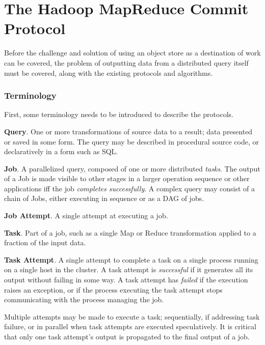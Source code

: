 \documentclass[format=acmsmall, screen=true, nonacm, timestamp, review=false]{acmart}
\begin{document}

\section{The Hadoop MapReduce Commit Protocol}
\label{sec:hadoop-mr-commit}

Before the challenge and solution of using an object store as a destination
of work can be covered, the problem of outputting data from a distributed
query itself must be covered, along with the existing protocols and algorithms.


\subsubsection{Terminology}

First, some terminology needs to be introduced to describe
the protocols.


\textbf{Query}.
One or more transformations of source data to a result;
data presented or saved in some form.
The query may be described in procedural source code,
or declaratively in a form such as SQL\@.


\textbf{Job}.
A parallelized query, composed of one or more distributed \emph{tasks}.
The output of a Job is made visible to other stages in a larger operation
sequence or other applications iff the job \emph{completes successfully}.
A complex query may consist of a chain of Jobs, either executing in sequence
or as a DAG of jobs.

\textbf{Job Attempt}.
A single attempt at executing a job.

\textbf{Task}.
Part of a job, such as a single Map or Reduce transformation applied to a fraction
of the input data.


\textbf{Task Attempt}.
A single attempt to complete a task on a single process running on a single host
in the cluster.
A task attempt is \emph{successful} if it generates all its output without
failing in some way.
A task attempt has \emph{failed} if the execution raises an exception, or
if the process executing the task attempt stops communicating with
the process managing the job.

Multiple attempts may be made to execute a task;
sequentially, if addressing task failure, or in parallel when task attempts are
executed speculatively.
It is critical that only one task attempt's output is propagated
to the final output of a job.
\end{document}
